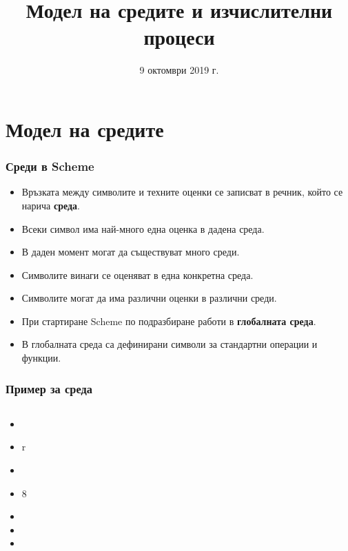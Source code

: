 \documentclass[alsotrans]{beamerswitch}
\title[Среди и процеси]{Модел на средите и изчислителни процеси}
\date{9 октомври 2019 г.}
\begin{document}
\begin{frame}
  \titlepage
\end{frame}

\section{Модел на средите}

\begin{frame}
  \frametitle{Среди в Scheme}

  \begin{itemize}[<+->]
  \item Връзката между символите и техните оценки се записват в речник, който се нарича \textbf{среда}.
  \item Всеки символ има най-много една оценка в дадена среда.
  \item В даден момент могат да съществуват много среди.
  \item Символите винаги се оценяват в една конкретна среда.
  \item \alert{Символите могат да има различни оценки в различни среди.}
  \item При стартиране Scheme по подразбиране работи в \textbf{глобалната среда}.
  \item В глобалната среда са дефинирани символи за стандартни операции и функции.
  \end{itemize}
\end{frame}

\begin{frame}
  \frametitle{Пример за среда}

  \begin{columns}[T,onlytextwidth]
    \begin{column}{.5\textwidth}
      \begin{itemize}[<+->]
      \item {}
      \item \evalstoerr r
      \item {}
      \item {}8
      \item {}
      \item {}
      \item {}
      \end{itemize}
    \end{column}

    \begin{column}{.5\textwidth}
    \end{column}
  \end{columns}
\end{frame}
\end{document}
